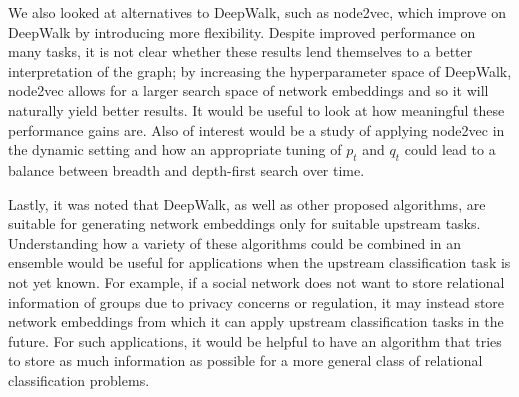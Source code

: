 \documentclass[a4paper]{article}
\begin{document}
We also looked at alternatives to DeepWalk, such as node2vec, which improve on DeepWalk by introducing more flexibility. Despite improved performance on many tasks, it is not clear whether these results lend themselves to a better interpretation of the graph; by increasing the hyperparameter space of DeepWalk, node2vec allows for a larger search space of network embeddings and so it will naturally yield better results.
It would be useful to look at how meaningful these performance gains are. Also of interest would be a study of applying node2vec in the dynamic setting and how an appropriate tuning of $p_t$ and $q_t$ could lead to a balance between breadth and depth-first search over time.

Lastly, it was noted that DeepWalk, as well as other proposed algorithms, are suitable for generating network embeddings only for suitable upstream tasks. Understanding how a variety of these algorithms could be combined in an ensemble would be useful for applications when the upstream classification task is not yet known. For example, if a social network
does not want to store relational information of groups due to privacy concerns or regulation, it may instead store network embeddings from which it can apply upstream classification tasks in the future. For such applications, it would be helpful to have an algorithm that tries to store as much information as possible for a more general class of relational classification problems.






\printindex
\end{document}
